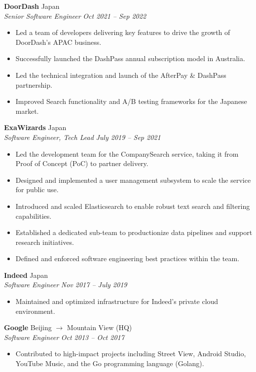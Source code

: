 \documentclass[10pt,a4paper]{article}
\newcommand{\entry}[4]{
  \textbf{#1} \hfill #2 \\
  \textit{#3} \hfill \textit{#4}
}
\begin{document}
\entry{DoorDash}{Japan}{Senior Software Engineer}{Oct 2021 -- Sep 2022}
\begin{itemize}[noitemsep, leftmargin=*]
    \item Led a team of developers delivering key features to drive the growth of DoorDash's APAC business.
    \item Successfully launched the DashPass annual subscription model in Australia.
    \item Led the technical integration and launch of the AfterPay \& DashPass partnership.
    \item Improved Search functionality and A/B testing frameworks for the Japanese market.
\end{itemize}
\vspace{6pt}

\entry{ExaWizards}{Japan}{Software Engineer, Tech Lead}{July 2019 -- Sep 2021}
\begin{itemize}[noitemsep, leftmargin=*]
    \item Led the development team for the CompanySearch service, taking it from Proof of Concept (PoC) to partner delivery.
    \item Designed and implemented a user management subsystem to scale the service for public use.
    \item Introduced and scaled Elasticsearch to enable robust text search and filtering capabilities.
    \item Established a dedicated sub-team to productionize data pipelines and support research initiatives.
    \item Defined and enforced software engineering best practices within the team.
\end{itemize}
\vspace{6pt}

\entry{Indeed}{Japan}{Software Engineer}{Nov 2017 -- July 2019}
\begin{itemize}[noitemsep, leftmargin=*]
    \item Maintained and optimized infrastructure for Indeed's private cloud environment.
\end{itemize}
\vspace{6pt}

\entry{Google}{Beijing $\to$ Mountain View (HQ)}{Software Engineer}{Oct 2013 -- Oct 2017}
\begin{itemize}[noitemsep, leftmargin=*]
    \item Contributed to high-impact projects including Street View, Android Studio, YouTube Music, and the Go programming language (Golang).
\end{itemize}
\end{document}
